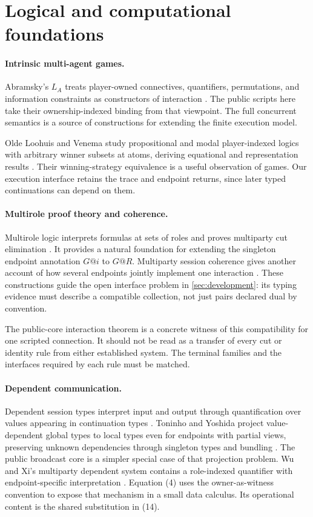 \section{Logical and computational foundations}
\label{sec:foundations}

\paragraph{Intrinsic multi-agent games.}
Abramsky's $L_A$ treats player-owned connectives, quantifiers, permutations,
and information constraints as constructors of interaction
\cite{Abramsky2007}. The public scripts here take their ownership-indexed
binding from that viewpoint. The full concurrent semantics is a source of
constructions for extending the finite execution model.

Olde Loohuis and Venema study propositional and modal player-indexed logics
with arbitrary winner subsets at atoms, deriving equational and representation
results \cite{OldeLoohuisVenema2010}. Their winning-strategy equivalence is a
useful observation of games. Our execution interface retains the trace and
endpoint returns, since later typed continuations can depend on them.

\paragraph{Multirole proof theory and coherence.}
Multirole logic interprets formulas at sets of roles and proves multiparty
cut elimination \cite{XiWu2023}. It provides a natural foundation for extending
the singleton endpoint annotation $G@i$ to $G@R$. Multiparty session
coherence gives another account of how several endpoints jointly implement
one interaction \cite{CarboneEtAl2016}. These constructions guide the open
interface problem in \cref{sec:development}: its typing evidence must describe
a compatible collection, not just pairs declared dual by convention.

The public-core interaction theorem is a concrete witness of this
compatibility for one scripted connection. It should not be read as a
transfer of every cut or identity rule from either established system. The
terminal families and the interfaces required by each rule must be matched.

\paragraph{Dependent communication.}
Dependent session types interpret input and output through quantification
over values appearing in continuation types
\cite{ToninhoCairesPfenning2011}. Toninho and Yoshida project value-dependent
global types to local types even for endpoints with partial views, preserving
unknown dependencies through singleton types and bundling
\cite{ToninhoYoshida2017}. The public broadcast core is a simpler special
case of that projection problem. Wu and Xi's multiparty dependent system
contains a role-indexed quantifier with endpoint-specific interpretation
\cite{WuXi2018}. Equation (4) uses the owner-as-witness convention to expose
that mechanism in a small data calculus. Its operational content is the
shared substitution in (14).

